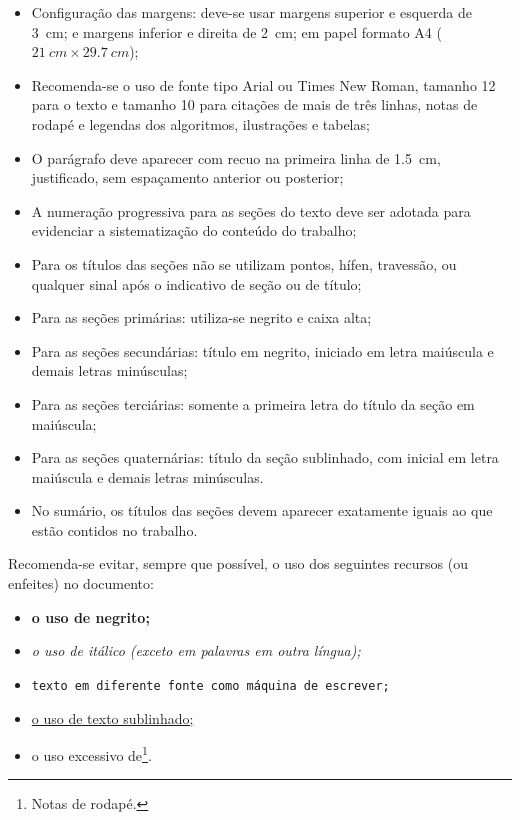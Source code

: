 \begin{itemize}%
\item Configuração das margens: deve-se usar margens superior e esquerda de \SI{3}{cm}; e margens inferior e direita de \SI{2}{cm}; em papel formato A4 ($\SI{21}{cm} \times \SI{29,7}{cm}$);
\item Recomenda-se o uso de fonte tipo Arial ou Times New Roman, tamanho 12 para o texto e tamanho 10 para citações de mais de três linhas, notas de rodapé e legendas dos algoritmos, ilustrações e tabelas;
\item O parágrafo deve aparecer com recuo na primeira linha de \SI{1,5}{cm}, justificado, sem espaçamento anterior ou posterior;
\item A numeração progressiva para as seções do texto deve ser adotada para evidenciar a sistematização do conteúdo do trabalho;
\item Para os títulos das seções não se utilizam pontos, hífen, travessão, ou qualquer sinal após o indicativo de seção ou de título;
\item Para as seções primárias: utiliza-se negrito e caixa alta;
\item Para as seções secundárias: título em negrito, iniciado em letra maiúscula e demais letras minúsculas;
\item Para as seções terciárias: somente a primeira letra do título da seção em
maiúscula;
\item Para as seções quaternárias: título da seção sublinhado, com inicial em letra maiúscula e demais letras minúsculas.
\item No sumário, os títulos das seções devem aparecer exatamente iguais ao que estão contidos no trabalho.
\end{itemize}


Recomenda-se evitar, sempre que possível, o uso dos seguintes recursos (ou enfeites) no documento:

\begin{itemize}%
\item \textbf{o uso de negrito;}
\item \textit{o uso de itálico (exceto em palavras em outra língua);}
\item \texttt{texto em diferente fonte como máquina de escrever;}
\item \underline{o uso de texto sublinhado;}
\item o uso excessivo de\footnote{Notas de rodapé.}.
\end{itemize}


